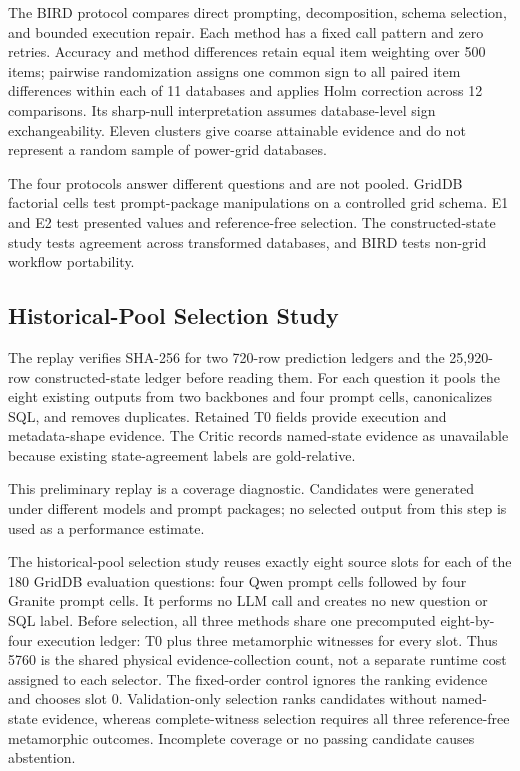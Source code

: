 \documentclass[applsci,article,submit,moreauthors]{Definitions/mdpi}
\begin{document}
The BIRD protocol compares direct prompting, decomposition, schema selection, and bounded execution repair. Each method has a fixed call pattern and zero retries. Accuracy and method differences retain equal item weighting over 500 items; pairwise randomization assigns one common sign to all paired item differences within each of 11 databases and applies Holm correction across 12 comparisons. Its sharp-null interpretation assumes database-level sign exchangeability. Eleven clusters give coarse attainable evidence and do not represent a random sample of power-grid databases.

The four protocols answer different questions and are not pooled. GridDB factorial cells test prompt-package manipulations on a controlled grid schema. E1 and E2 test presented values and reference-free selection. The constructed-state study tests agreement across transformed databases, and BIRD tests non-grid workflow portability.

\subsection{Historical-Pool Selection Study}

The replay verifies SHA-256 for two 720-row prediction ledgers and the 25,920-row constructed-state ledger before reading them. For each question it pools the eight existing outputs from two backbones and four prompt cells, canonicalizes SQL, and removes duplicates. Retained T0 fields provide execution and metadata-shape evidence. The Critic records named-state evidence as unavailable because existing state-agreement labels are gold-relative.

This preliminary replay is a coverage diagnostic. Candidates were generated under different models and prompt packages; no selected output from this step is used as a performance estimate.

The historical-pool selection study reuses exactly eight source slots for each of the 180 GridDB evaluation questions: four Qwen prompt cells followed by four Granite prompt cells. It performs no LLM call and creates no new question or SQL label. Before selection, all three methods share one precomputed eight-by-four execution ledger: T0 plus three metamorphic witnesses for every slot. Thus 5760 is the shared physical evidence-collection count, not a separate runtime cost assigned to each selector. The fixed-order control ignores the ranking evidence and chooses slot 0. Validation-only selection ranks candidates without named-state evidence, whereas complete-witness selection requires all three reference-free metamorphic outcomes. Incomplete coverage or no passing candidate causes abstention.
\end{document}
